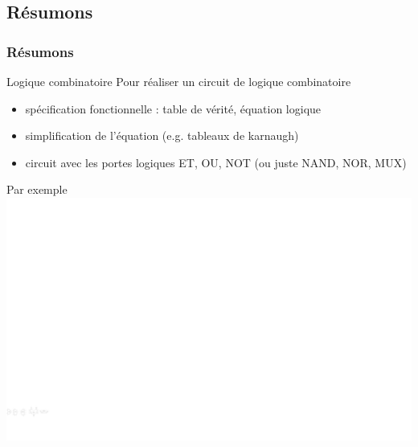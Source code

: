 \documentclass{beamer}
\begin{document}
\subsection{Résumons}
\begin{frame}
\frametitle{Résumons}
\begin{small}
\begin{block}{Logique combinatoire}
Pour réaliser un circuit de logique combinatoire 
\begin{itemize}
\item spécification fonctionnelle : table de vérité, équation logique
\item simplification de l'équation (e.g. tableaux de karnaugh)
\item circuit avec les portes logiques ET, OU, NOT (ou juste NAND, NOR, MUX)
\end{itemize}
\end{block}
\end{small}
\begin{block}{Par exemple}
\centering\includegraphics[width=\linewidth]{Figs/circuits_logique_combinatoire.pdf}
\end{block}
\end{frame}
\end{document}
